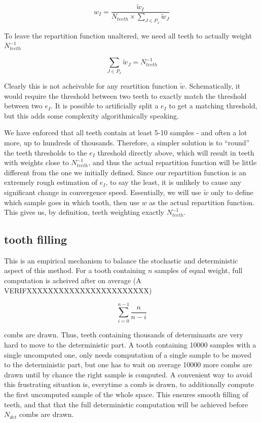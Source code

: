 \documentclass[./thesis.tex]{subfiles}
\begin{document}
$$w_I = \frac{\tilde w_I}{N_{teeth} \times \sum_{J \in P_x} \tilde w_J}$$

To leave the repartition function unaltered, we need all teeth to actually weight $N_{teeth}^{-1}$

$$\sum_{J \in P_x} \tilde w_J = N_{teeth}^{-1}$$

Clearly this is not acheivable for any reartition function $\tilde w$. Schematically, it would require the threshold between two teeth to exactly match the threshold between two $e_I$. It is possible to artificially split a $e_I$ to get a matching threshold, but this adds some complexity algorithmically speaking.

We have enforced that all teeth contain at least 5-10 samples - and often a lot more, up to hundreds of thousands. Therefore, a simpler solution is to ``round'' the teeth thresholds to the $e_I$ threshold directly above, which will result in teeth with weights close to $N_{teeth}^{-1}$, and thus the actual repartition function will be little different from the one we initially defined. Since our repartition function is an extremely rough estimation of $e_I$, to say the least, it is unlikely to cause any significant change in convergence speed.
Essentially, we will use $\tilde w$ only to define which sample goes in which tooth, then use $w$ as the actual repartition function. This gives us, by definition, teeth weighting exactly $N_{teeth}^{-1}$.

\subsection*{tooth filling}

This is an empirical mechanism to balance the stochastic and deterministic aspect of this method. For a tooth containing $n$ samples of equal weight, full computation is acheived after on average (A VERIFXXXXXXXXXXXXXXXXXXXXXXX)

$$\sum_{i=0}^{n-1} \frac{n}{n-i}$$

combs are drawn. Thus, teeth containing thousands of determinants are very hard to move to the deterministic part. A tooth containing 10000 samples with a single uncomputed one, only needs computation of a single sample to be moved to the deterministic part, but one has to wait on average 10000 more combs are drawn until by chance the right sample is computed.
A convenient way to avoid this frustrating situation is, everytime a comb is drawn, to additionally compute the first uncomputed sample of the whole space. This ensures smooth filling of teeth, and that that the full deterministic computation will be achieved before $N_{det}$ combs are drawn.
\end{document}
